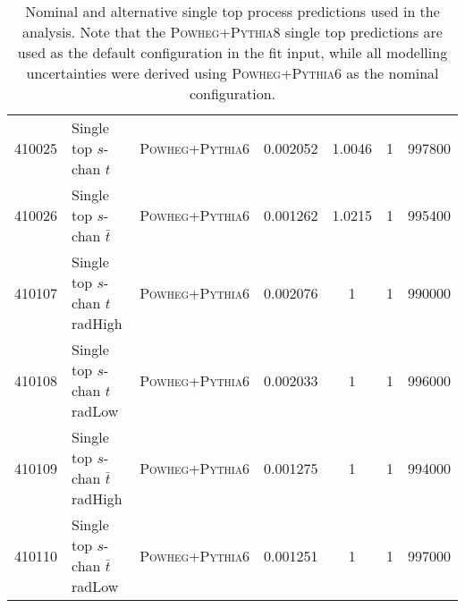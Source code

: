 \begin{table}[hb]
{\begin{tabular}{rllS[table-format=3.2]S[table-format=3.2]rr}
      410025 & Single top $s$-chan $t$ & \textsc{Powheg}+\textsc{Pythia}6 & 0.002052 & 1.0046 & 1 &  997800\\
      410026 & Single top $s$-chan $\bar{t}$ & \textsc{Powheg}+\textsc{Pythia}6 & 0.001262 & 1.0215 & 1 &  995400\\
      410107 & Single top $s$-chan $t$ radHigh  & \textsc{Powheg}+\textsc{Pythia}6 & 0.002076 & 1 & 1 & 990000\\
      410108 & Single top $s$-chan $t$ radLow  & \textsc{Powheg}+\textsc{Pythia}6 & 0.002033 & 1 & 1 & 996000\\
      410109 & Single top $s$-chan $\bar{t}$ radHigh & \textsc{Powheg}+\textsc{Pythia}6  & 0.001275 & 1 & 1 & 994000\\
      410110 & Single top $s$-chan $\bar{t}$ radLow  & \textsc{Powheg}+\textsc{Pythia}6 & 0.001251 & 1 & 1 & 997000\\
      \bottomrule
  \end{tabular}
  }
  \caption[Nominal and alternative single top samples.]{Nominal and alternative
    single top process predictions used in the analysis. Note that the
    \textsc{Powheg}+\textsc{Pythia}8 single top predictions are used as the
    default configuration in the fit input, while all modelling uncertainties
    were derived using \textsc{Powheg}+\textsc{Pythia}6 as the nominal
    configuration.}
  \label{tab:st-nom-alt}
\end{table}